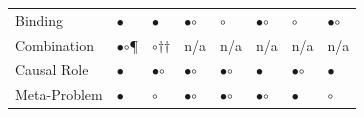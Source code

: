 \documentclass[12pt]{article}
\begin{document}
\begin{table}[H]
\begin{tabularx}{\textwidth}{lXXXXXXX}
Binding & {$\bullet$} & {$\bullet$} & {\large$\bullet$\hspace{-8.5pt}$\circ$} & {$\circ$} & {\large$\bullet$\hspace{-8.5pt}$\circ$} & {$\circ$} & {\large$\bullet$\hspace{-8.5pt}$\circ$} \\
Combination & {\large$\bullet$\hspace{-8.5pt}$\circ$}\P & {$\circ$}$\dagger$$\dagger$ & n/a & n/a & n/a & n/a & n/a \\
Causal Role & {$\bullet$} & {\large$\bullet$\hspace{-8.5pt}$\circ$} & {\large$\bullet$\hspace{-8.5pt}$\circ$} & {\large$\bullet$\hspace{-8.5pt}$\circ$} & {$\bullet$} & {\large$\bullet$\hspace{-8.5pt}$\circ$} & {$\bullet$} \\
Meta-Problem & {$\bullet$} & {$\circ$} & {\large$\bullet$\hspace{-8.5pt}$\circ$} & {\large$\bullet$\hspace{-8.5pt}$\circ$} & {\large$\bullet$\hspace{-8.5pt}$\circ$} & {$\bullet$} & {$\circ$} \\
\bottomrule
\end{tabularx}
\end{table}
\end{document}
